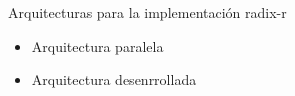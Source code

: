 \begin{frame}{Arquitecturas para la implementación radix-r}
  \begin{itemize}
    \item<1-> Arquitectura paralela
    \item<1-> Arquitectura desenrrollada
\end{itemize}
\end{frame}

